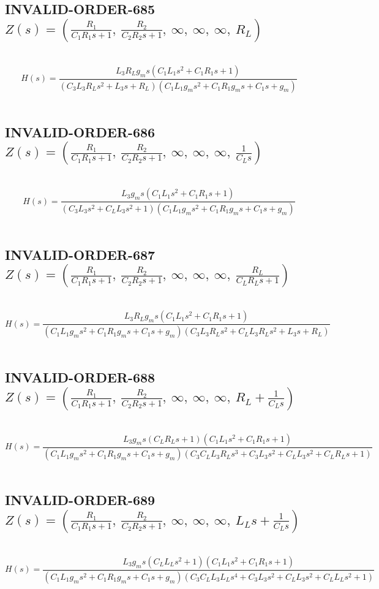\documentclass{article}
\begin{document}
\subsection{INVALID-ORDER-685 $Z(s) = \left( \frac{R_{1}}{C_{1} R_{1} s + 1}, \  \frac{R_{2}}{C_{2} R_{2} s + 1}, \  \infty, \  \infty, \  \infty, \  R_{L}\right)$ } \ 
\textbf{\[H(s) = \frac{L_{3} R_{L} g_{m} s \left(C_{1} L_{1} s^{2} + C_{1} R_{1} s + 1\right)}{\left(C_{3} L_{3} R_{L} s^{2} + L_{3} s + R_{L}\right) \left(C_{1} L_{1} g_{m} s^{2} + C_{1} R_{1} g_{m} s + C_{1} s + g_{m}\right)}\] } \ 
\subsection{INVALID-ORDER-686 $Z(s) = \left( \frac{R_{1}}{C_{1} R_{1} s + 1}, \  \frac{R_{2}}{C_{2} R_{2} s + 1}, \  \infty, \  \infty, \  \infty, \  \frac{1}{C_{L} s}\right)$ } \ 
\textbf{\[H(s) = \frac{L_{3} g_{m} s \left(C_{1} L_{1} s^{2} + C_{1} R_{1} s + 1\right)}{\left(C_{3} L_{3} s^{2} + C_{L} L_{3} s^{2} + 1\right) \left(C_{1} L_{1} g_{m} s^{2} + C_{1} R_{1} g_{m} s + C_{1} s + g_{m}\right)}\] } \ 
\subsection{INVALID-ORDER-687 $Z(s) = \left( \frac{R_{1}}{C_{1} R_{1} s + 1}, \  \frac{R_{2}}{C_{2} R_{2} s + 1}, \  \infty, \  \infty, \  \infty, \  \frac{R_{L}}{C_{L} R_{L} s + 1}\right)$ } \ 
\textbf{\[H(s) = \frac{L_{3} R_{L} g_{m} s \left(C_{1} L_{1} s^{2} + C_{1} R_{1} s + 1\right)}{\left(C_{1} L_{1} g_{m} s^{2} + C_{1} R_{1} g_{m} s + C_{1} s + g_{m}\right) \left(C_{3} L_{3} R_{L} s^{2} + C_{L} L_{3} R_{L} s^{2} + L_{3} s + R_{L}\right)}\] } \ 
\subsection{INVALID-ORDER-688 $Z(s) = \left( \frac{R_{1}}{C_{1} R_{1} s + 1}, \  \frac{R_{2}}{C_{2} R_{2} s + 1}, \  \infty, \  \infty, \  \infty, \  R_{L} + \frac{1}{C_{L} s}\right)$ } \ 
\textbf{\[H(s) = \frac{L_{3} g_{m} s \left(C_{L} R_{L} s + 1\right) \left(C_{1} L_{1} s^{2} + C_{1} R_{1} s + 1\right)}{\left(C_{1} L_{1} g_{m} s^{2} + C_{1} R_{1} g_{m} s + C_{1} s + g_{m}\right) \left(C_{3} C_{L} L_{3} R_{L} s^{3} + C_{3} L_{3} s^{2} + C_{L} L_{3} s^{2} + C_{L} R_{L} s + 1\right)}\] } \ 
\subsection{INVALID-ORDER-689 $Z(s) = \left( \frac{R_{1}}{C_{1} R_{1} s + 1}, \  \frac{R_{2}}{C_{2} R_{2} s + 1}, \  \infty, \  \infty, \  \infty, \  L_{L} s + \frac{1}{C_{L} s}\right)$ } \ 
\textbf{\[H(s) = \frac{L_{3} g_{m} s \left(C_{L} L_{L} s^{2} + 1\right) \left(C_{1} L_{1} s^{2} + C_{1} R_{1} s + 1\right)}{\left(C_{1} L_{1} g_{m} s^{2} + C_{1} R_{1} g_{m} s + C_{1} s + g_{m}\right) \left(C_{3} C_{L} L_{3} L_{L} s^{4} + C_{3} L_{3} s^{2} + C_{L} L_{3} s^{2} + C_{L} L_{L} s^{2} + 1\right)}\] } \ 
\end{document}
